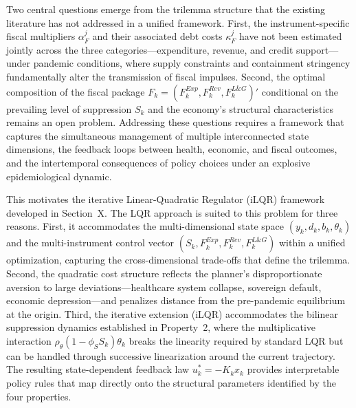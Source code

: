 Two central questions emerge from the trilemma structure that the existing literature has not addressed in a unified framework. First, the instrument-specific fiscal multipliers $\alpha_F^j$ and their associated debt costs $\kappa_F^j$ have not been estimated jointly across the three categories---expenditure, revenue, and credit support---under pandemic conditions, where supply constraints and containment stringency fundamentally alter the transmission of fiscal impulses. Second, the optimal composition of the fiscal package $F_k = (F_k^{Exp}, F_k^{Rev}, F_k^{L\&G})'$ conditional on the prevailing level of suppression $S_k$ and the economy's structural characteristics remains an open problem. Addressing these questions requires a framework that captures the simultaneous management of multiple interconnected state dimensions, the feedback loops between health, economic, and fiscal outcomes, and the intertemporal consequences of policy choices under an explosive epidemiological dynamic.

This motivates the iterative Linear-Quadratic Regulator (iLQR) framework developed in Section~X. The LQR approach is suited to this problem for three reasons. First, it accommodates the multi-dimensional state space $(y_k, d_k, b_k, \theta_k)$ and the multi-instrument control vector $(S_k, F_k^{Exp}, F_k^{Rev}, F_k^{L\&G})$ within a unified optimization, capturing the cross-dimensional trade-offs that define the trilemma. Second, the quadratic cost structure reflects the planner's disproportionate aversion to large deviations---healthcare system collapse, sovereign default, economic depression---and penalizes distance from the pre-pandemic equilibrium at the origin. Third, the iterative extension (iLQR) accommodates the bilinear suppression dynamics established in Property~2, where the multiplicative interaction $\rho_\theta(1 - \phi_S S_k)\theta_k$ breaks the linearity required by standard LQR but can be handled through successive linearization around the current trajectory. The resulting state-dependent feedback law $u_k^* = -K_k x_k$ provides interpretable policy rules that map directly onto the structural parameters identified by the four properties.



\newpage
\vspace{5mm}

